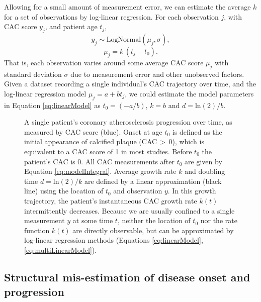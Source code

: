 \documentclass[aps,pre,twocolumn,twoside,tightenlines,groupedaddress,amsmath,amssymb,nobibnotes,final,showkeys,letterpaper]{revtex4-2}
\begin{document}
Allowing for a small amount of measurement error, we can estimate the average $k$ for a set of observations by log-linear regression. For each observation $j$, with CAC score $y_j$, and patient age $t_j$,
$$
  y_j \sim \mathrm{LogNormal}(\mu_j, \sigma),
$$
\begin{equation}
  \label{eq:linearModel}
  \mu_j = k\,(t_j - t_0).
\end{equation}
That is, each observation varies around some average CAC score $\mu_j$ with standard deviation $\sigma$ due to measurement error and other unobserved factors. Given a dataset recording a single individual's CAC trajectory over time, and the log-linear regression model $\mu_j = a + bt_j$, we could estimate the model parameters in Equation \ref{eq:linearModel} as $t_0 = (-a/b)$, $k = b$ and $d = \mathrm{ln}(2)/b$.

\begin{figure*}[ht]
  \centering
  
  \caption{A single patient's coronary atherosclerosis progression over time, as measured by CAC score (blue). Onset at age $t_0$ is defined as the initial appearance of calcified plaque (CAC\,$>$\,0), which is equivalent to a CAC score of 1 in most studies. Before $t_0$ the patient's CAC is 0. All CAC measurements after $t_0$ are given by Equation \ref{eq:modelIntegral}. Average growth rate $k$ and doubling time $d = \mathrm{ln}(2)/k$ are defined by a linear approximation (black line) using the location of $t_0$ and observation $y$. In this growth trajectory, the patient's instantaneous CAC growth rate $k(t)$ intermittently decreases. Because we are usually confined to a single measurement $y$ at some time $t$, neither the location of $t_0$ nor the rate function $k(t)$ are directly observable, but can be approximated by log-linear regression methods (Equations \ref{eq:linearModel}, \ref{eq:multiLinearModel}).}
  \label{fig:singleTrajectory}
\end{figure*}

\subsection*{Structural mis-estimation of disease onset and progression}
\end{document}
